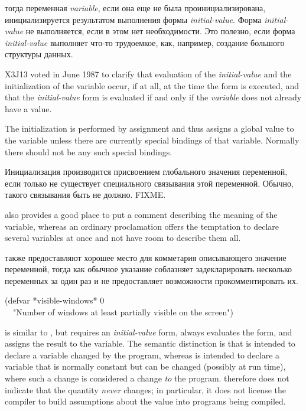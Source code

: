 \begin{defmac}
тогда переменная \textit{variable}, если она еще не была проинициализирована,
инициализируется результатом выполнения формы \textit{initial-value}. Форма
\textit{initial-value} не выполняется, если в этом нет необходимости. Это
полезно, если форма \textit{initial-value} выполняет что-то
трудоемкое, как, например, создание большого структуры данных.

\begin{newer}
X3J13 voted in June 1987  to clarify that
evaluation of the \textit{initial-value} and the initialization of the
variable occur, if at all, at the time the  form is executed,
and that the \textit{initial-value} form is evaluated
if and only if the \textit{variable} does not already have a value.
\end{newer}
The initialization is
performed by assignment and thus assigns a global value to the variable
unless there are currently special bindings of that variable.
Normally there should not be any such special bindings.

Инициализация производится присвоением глобального значения переменной, если
только не существует специального связывания этой переменной.
Обычно, такого связывания быть не должно. FIXME.

 also provides a good place to put a comment describing the
meaning of the variable, whereas an ordinary  proclamation
offers the
temptation to declare several variables at once and not have room to
describe them all.

 также предоставляют хорошее место для комметария описывающего
значение переменной, тогда как обычное  указание соблазняет
задекларировать несколько переменных за один раз и не предоставляет возможности
прокомментировать их.

\begin{lisp}
(defvar *visible-windows* 0 \\
~~"Number of windows at least partially visible on the screen")
\end{lisp}

 is similar to , but  requires
an \textit{initial-value} form, always evaluates the form, and assigns the
result to the variable.  The semantic distinction is that 
is intended to declare a variable changed by the program, whereas
 is intended to declare a variable that is normally
constant but can be changed (possibly at run time), where such a change
is considered a
change \textit{to} the program.   therefore does not indicate
that the quantity \textit{never} changes; in particular, it does not license
the compiler to build assumptions about the value into programs being
compiled.


\end{defmac}
